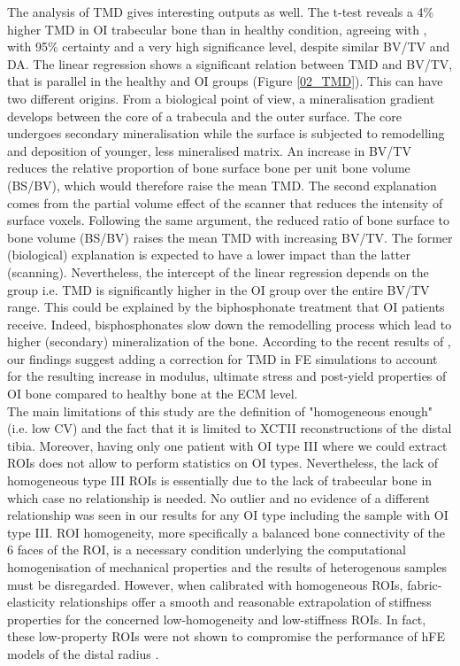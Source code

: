 \documentclass[a4paper,fleqn]{DC_ArtStyle}
\begin{document}
	The analysis of TMD gives interesting outputs as well. The t-test reveals a 4\% higher TMD in OI trabecular bone than in healthy condition, agreeing with \citeauthor{Boyde1999}\cite{Boyde1999}, with 95\% certainty and a very high significance level, despite similar BV/TV and DA. The linear regression shows a significant relation between TMD and BV/TV, that is parallel in the healthy and OI groups (Figure \ref{02_TMD}). This can have two different origins. From a biological point of view, a mineralisation gradient develops between the core of a trabecula and the outer surface. The core undergoes secondary mineralisation while the surface is subjected to remodelling and deposition of younger, less mineralised matrix. An increase in BV/TV reduces the relative proportion of bone surface bone per unit bone volume (BS/BV), which would therefore raise the mean TMD. The second explanation comes from the partial volume effect of the scanner that reduces the intensity of surface voxels. Following the same argument, the reduced ratio of bone surface to bone volume (BS/BV) raises the mean TMD with increasing BV/TV. The former (biological) explanation is expected to have a lower impact than the latter (scanning). Nevertheless, the intercept of the linear regression depends on the group i.e. TMD is significantly higher in the OI group over the entire BV/TV range. This could be explained by the biphosphonate treatment that OI patients receive. Indeed, bisphosphonates slow down the remodelling process which lead to higher (secondary) mineralization of the bone. According to the recent results of \citeauthor{Indermaur2021}\cite{Indermaur2021}, our findings suggest adding a correction for TMD in FE simulations to account for the resulting increase in modulus, ultimate stress and post-yield properties of OI bone compared to healthy bone at the ECM level.\\
	
	The main limitations of this study are the definition of "homogeneous enough" (i.e. low CV) and the fact that it is limited to XCTII reconstructions of the distal tibia. Moreover, having only one patient with OI type III where we could extract ROIs does not allow to perform statistics on OI types. Nevertheless, the lack of homogeneous type III ROIs is essentially due to the lack of trabecular bone in which case no relationship is needed. No outlier and no evidence of a different relationship was seen in our results for any OI type including the sample with OI type III. ROI homogeneity, more specifically a balanced bone connectivity of the 6 faces of the ROI, is a necessary condition underlying the computational homogenisation of mechanical properties and the results of heterogenous samples must be disregarded. However, when calibrated with homogeneous ROIs, fabric-elas\-ticity relationships offer a smooth and reasonable extrapolation of stiffness properties for the concerned low-ho\-mo\-ge\-nei\-ty and low-stiffness ROIs. In fact, these low-property ROIs were not shown to compromise the performance of hFE models of the distal radius \cite{Varga2011, Hosseini2017, AriasMoreno2019}.\\
	
\end{document}
